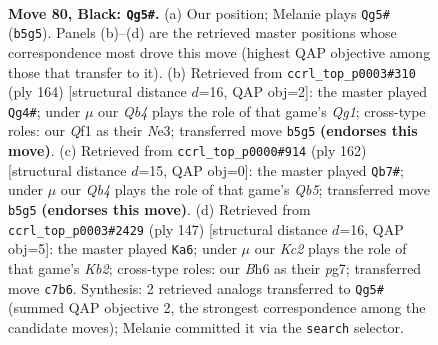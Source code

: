 \documentclass[11pt]{article}
\begin{document}
\clearpage

\begin{figure}[p]\centering
\begin{subfigure}{0.46\textwidth}\centering
\resizebox{\linewidth}{!}{%
\newchessgame
\chessboard[
  setfen={8/2k5/7b/1q6/7K/8/8/5q2 b - - 3 80},
  showmover=false,
  pgfstyle=straightmove, color=movearrow, markmove={b5-g5}
]}
\caption{}
\end{subfigure}\hfill
\begin{subfigure}{0.46\textwidth}\centering
\resizebox{\linewidth}{!}{%
\newchessgame
\chessboard[
  setfen={8/8/8/8/7k/4N3/1K6/6Q1 w - - 1 83},
  showmover=false,
  pgfstyle=straightmove, color=movearrow, markmove={g1-g4}
]}
\caption{}
\end{subfigure}
\\[4pt]
\begin{subfigure}{0.46\textwidth}\centering
\resizebox{\linewidth}{!}{%
\newchessgame
\chessboard[
  setfen={8/k7/2K5/1Q6/8/8/8/8 w - - 15 82},
  showmover=false,
  pgfstyle=straightmove, color=movearrow, markmove={b5-b7}
]}
\caption{}
\end{subfigure}\hfill
\begin{subfigure}{0.46\textwidth}\centering
\resizebox{\linewidth}{!}{%
\newchessgame
\chessboard[
  setfen={8/1k4P1/7K/q7/8/5Q2/8/q7 b - - 9 74},
  showmover=false,
  pgfstyle=straightmove, color=movearrow, markmove={b7-a6}
]}
\caption{}
\end{subfigure}
\caption{\textbf{Move 80, Black: \texttt{Qg5\#}.} (a) Our position; Melanie plays \texttt{Qg5\#} (\texttt{b5g5}). Panels (b)--(d) are the retrieved master positions whose correspondence most drove this move (highest QAP objective among those that transfer to it). (b) Retrieved from \texttt{ccrl\_top\_p0003\#310} (ply 164) [structural distance $d$=16, QAP obj=2]: the master played \texttt{Qg4\#}; under $\mu$ our \emph{Qb4} plays the role of that game's \emph{Qg1}; cross-type roles: our \emph{Q}f1 as their \emph{N}e3; transferred move \texttt{b5g5} \textbf{(endorses this move)}. (c) Retrieved from \texttt{ccrl\_top\_p0000\#914} (ply 162) [structural distance $d$=15, QAP obj=0]: the master played \texttt{Qb7\#}; under $\mu$ our \emph{Qb4} plays the role of that game's \emph{Qb5}; transferred move \texttt{b5g5} \textbf{(endorses this move)}. (d) Retrieved from \texttt{ccrl\_top\_p0003\#2429} (ply 147) [structural distance $d$=16, QAP obj=5]: the master played \texttt{Ka6}; under $\mu$ our \emph{Kc2} plays the role of that game's \emph{Kb2}; cross-type roles: our \emph{B}h6 as their \emph{p}g7; transferred move \texttt{c7b6}. Synthesis: 2 retrieved analogs transferred to \texttt{Qg5\#} (summed QAP objective 2, the strongest correspondence among the candidate moves); Melanie committed it via the \texttt{search} selector.}
\label{fig:thought-m159}
\end{figure}
\end{document}
